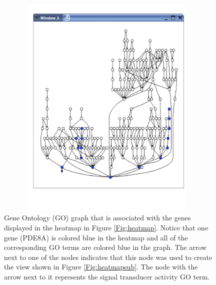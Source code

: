 \documentclass[11pt]{article}
\begin{document}
\begin{figure}[ht]
  \begin{center}
    \includegraphics[height=4.3in, width=4.3in]{GOgraph2.jpg}
    \caption{ Gene Ontology (GO) graph that is associated with the genes
      displayed in the heatmap in Figure \ref{Fig:heatmap}.  Notice that one
      gene (PDE8A) is colored blue in the heatmap and all of the corresponding
      GO terms are colored blue in the graph.  The arrow next to one of the
      nodes indicates that this node was used to create the view shown in
      Figure \ref{Fig:heatmapsub}.  The node with the arrow next to it
      represents the signal transducer activity GO term. }
    \label{Fig:GOgraph}
  \end{center}
\end{figure}
\end{document}

